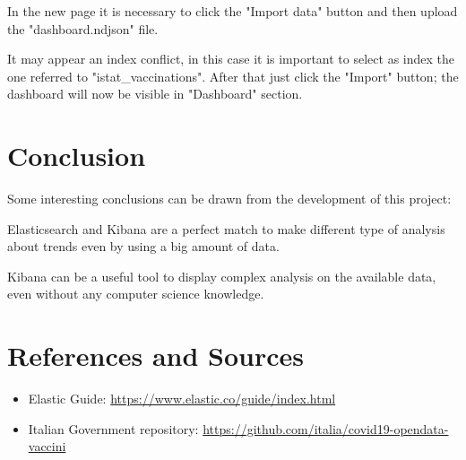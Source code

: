 \documentclass{article}
\begin{document}
In the new page it is necessary to click the {\selectfont"Import data"} button and then upload the {\selectfont"dashboard.ndjson"} file.

It may appear an index conflict, in this case it is important to select as index the one referred to {\selectfont"istat\_vaccinations"}.
After that just click the {\selectfont"Import"} button; the dashboard will now be visible in {\selectfont"Dashboard"} section.

\newpage

\section{Conclusion}

Some interesting conclusions can be drawn from the development of this project:

Elasticsearch and Kibana are a perfect match to make different type of analysis about trends even by using a big amount of data.

Kibana can be a useful tool to display complex analysis on the available data, even without any computer science knowledge.

\section{References and Sources}
\begin{itemize}
    \item Elastic Guide: \url{https://www.elastic.co/guide/index.html}
    \item Italian Government repository: \url{https://github.com/italia/covid19-opendata-vaccini}
    
\end{itemize}
\end{document}
